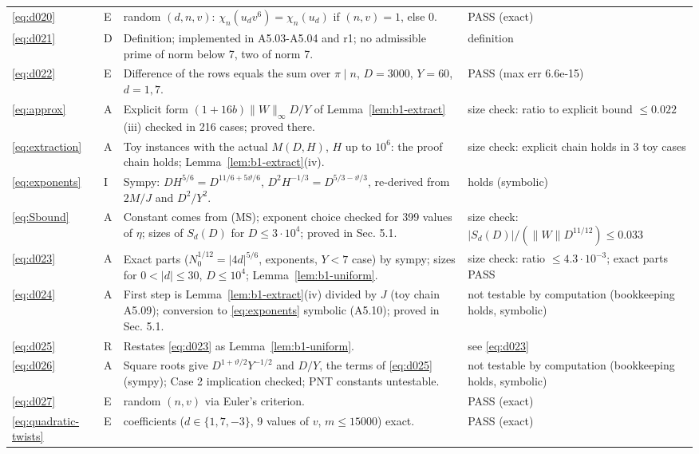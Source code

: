 \documentclass[11pt]{article}
\numberwithin{equation}{section}
\begin{document}
\begin{longtable}{@{}>{\raggedright\arraybackslash}p{1.2cm}>{\centering\arraybackslash}p{0.7cm}>{\raggedright\arraybackslash}p{9.05cm}>{\raggedright\arraybackslash}p{4.3cm}@{}}
\eqref{eq:d020} & E & 3000 random $(d,n,v)$: $\chi_n(u_dv^6)=\chi_n(u_d)$ if $(n,v)=1$, else 0. & PASS (exact)\\
\eqref{eq:d021} & D & Definition; implemented in A5.03-A5.04 and r1; no admissible prime of norm below 7, two of norm 7. & definition\\
\eqref{eq:d022} & E & Difference of the rows equals the sum over $\pi\mid n$, $D=3000$, $Y=60$, $d=1,7$. & PASS (max err 6.6e-15)\\
\eqref{eq:approx} & A & Explicit form $(1+16b)\|W\|_\infty D/Y$ of Lemma~\ref{lem:b1-extract}(iii) checked in 216 cases; proved there. & size check: ratio to explicit bound $\le0.022$\\
\eqref{eq:extraction} & A & Toy instances with the actual $M(D,H)$, $H$ up to $10^6$: the proof chain holds; Lemma~\ref{lem:b1-extract}(iv). & size check: explicit chain holds in 3 toy cases\\
\eqref{eq:exponents} & I & Sympy: $DH^{5/6}=D^{11/6+5\vartheta/6}$, $D^2H^{-1/3}=D^{5/3-\vartheta/3}$, re-derived from $2M/J$ and $D^2/Y^2$. & holds (symbolic)\\
\eqref{eq:Sbound} & A & Constant comes from (MS); exponent choice checked for 399 values of $\eta$; sizes of $S_d(D)$ for $D\le3\cdot10^4$; proved in Sec. 5.1. & size check: $|S_d(D)|/(\|W\|D^{11/12})\le0.033$\\
\eqref{eq:d023} & A & Exact parts ($N_0^{1/12}=|4d|^{5/6}$, exponents, $Y<7$ case) by sympy; sizes for $0<|d|\le30$, $D\le10^4$; Lemma~\ref{lem:b1-uniform}. & size check: ratio $\le4.3\cdot10^{-3}$; exact parts PASS\\
\eqref{eq:d024} & A & First step is Lemma~\ref{lem:b1-extract}(iv) divided by $J$ (toy chain A5.09); conversion to \eqref{eq:exponents} symbolic (A5.10); proved in Sec. 5.1. & not testable by computation (bookkeeping holds, symbolic)\\
\eqref{eq:d025} & R & Restates \eqref{eq:d023} as Lemma~\ref{lem:b1-uniform}. & see \eqref{eq:d023}\\
\eqref{eq:d026} & A & Square roots give $D^{1+\vartheta/2}Y^{-1/2}$ and $D/Y$, the terms of \eqref{eq:d025} (sympy); Case 2 implication checked; PNT constants untestable. & not testable by computation (bookkeeping holds, symbolic)\\
\eqref{eq:d027} & E & 2000 random $(n,v)$ via Euler's criterion. & PASS (exact)\\
\eqref{eq:quadratic-twists} & E & 135000 coefficients ($d\in\{1,7,-3\}$, 9 values of $v$, $m\le15000$) exact. & PASS (exact)\\

\end{longtable}
\end{document}
